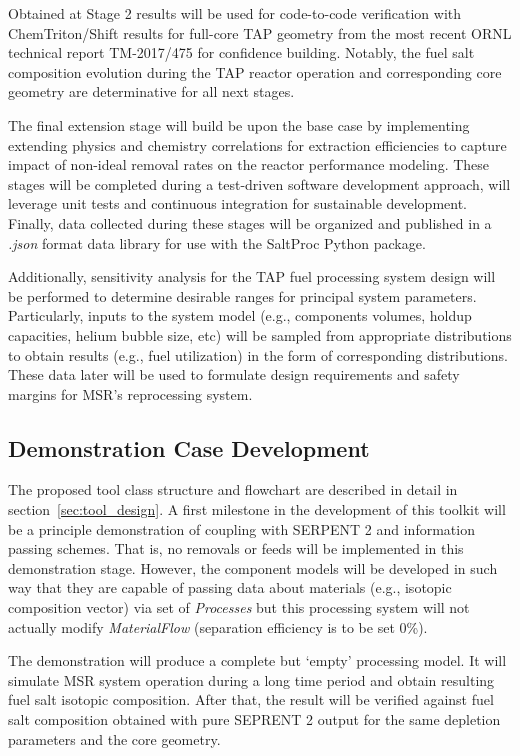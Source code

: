 Obtained at Stage 2 results will be used for code-to-code verification with  
ChemTriton/Shift results for full-core \gls{TAP} geometry from the most recent 
\gls{ORNL} technical report TM-2017/475 \cite{betzler_assessment_2017} for 
confidence building. Notably, the fuel salt composition evolution during the 
\gls{TAP} reactor operation and corresponding core geometry are determinative  
for all next stages.



The final extension stage will build be upon the base case by 
implementing extending physics and chemistry correlations for 
extraction efficiencies to capture impact of non-ideal 
removal rates on the reactor performance modeling. These 
stages will be completed during a test-driven software 
development approach, will leverage unit tests and 
continuous integration for sustainable development. Finally, 
data collected during these stages will be organized and 
published in a \textit{.json} format data library for use 
with the SaltProc Python package.

Additionally, sensitivity analysis for the \gls{TAP} fuel processing 
system design will be performed to determine desirable ranges 
for principal system parameters. Particularly, inputs to the 
system model (e.g., components volumes, holdup capacities, helium 
bubble size, etc) will be sampled from appropriate 
distributions to obtain results (e.g., fuel utilization) in the 
form of corresponding distributions. These data later will be used
to formulate design requirements and safety margins for 
\gls{MSR}'s reprocessing system.

\subsection{Demonstration Case Development}
The proposed tool class structure and flowchart are 
described in detail in section~\ref{sec:tool_design}.
A first milestone in the development of this toolkit will be a 
principle demonstration of coupling with SERPENT 2 and 
information passing schemes. That is, no removals or feeds 
will be implemented in this demonstration stage. However, 
the component models will be developed in such way that 
they are capable of passing data about materials (e.g., isotopic 
composition vector) via set of \textit{Processes} but this 
processing system will not actually modify \textit{MaterialFlow} 
(separation efficiency is to be set 0\%).

The demonstration will produce a complete but `empty' processing 
model. It will simulate \gls{MSR} system operation during 
a long time period and obtain resulting fuel salt isotopic composition. 
After that, the result will be verified against fuel salt 
composition obtained with pure SEPRENT 2 output for the same 
depletion parameters and the core geometry.%

